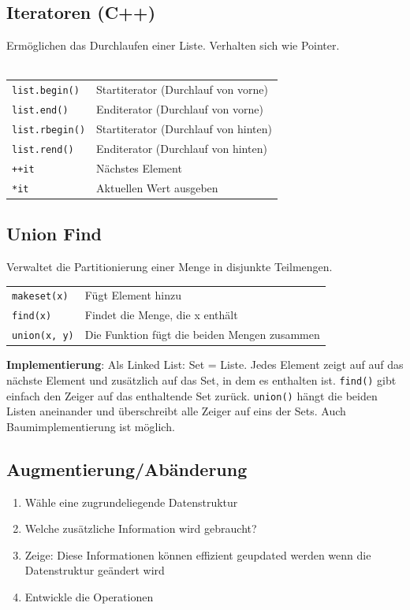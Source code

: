 \documentclass[fs, footer]{latex4ei}
\renewcommand{\t}{\texttt}
\begin{document}
\begin{multicols*}{4}
{{\subsection{Iteratoren (C++)}
Ermöglichen das Durchlaufen einer Liste.
Verhalten sich wie Pointer.\\ \\
\begin{tabular}{ll}
\t{list.begin()}& Startiterator (Durchlauf von vorne)\\
\t{list.end()}& Enditerator (Durchlauf von vorne)\\
\t{list.rbegin()}& Startiterator (Durchlauf von hinten)\\
\t{list.rend()}& Enditerator (Durchlauf von hinten)\\
\t{++it}& Nächstes Element\\
\t{*it}& Aktuellen Wert ausgeben\\
\end{tabular}


\subsection{Union Find}
Verwaltet die Partitionierung einer Menge in disjunkte Teilmengen.\\
\begin{tabular}{ll}
\t{makeset(x)}& Fügt Element hinzu\\
\t{find(x)}& Findet die Menge, die x enthält\\
\t{union(x, y)}& Die Funktion fügt die beiden Mengen zusammen\\
\end{tabular}
\textbf{Implementierung}: Als Linked List: Set = Liste. Jedes Element zeigt auf auf das nächste Element und zusätzlich auf das Set, in dem es enthalten ist. \t{find()} gibt einfach den Zeiger auf das enthaltende Set zurück. \t{union()} hängt die beiden Listen aneinander und überschreibt alle Zeiger auf eins der Sets. Auch Baumimplementierung ist möglich.
\begin{minipage}{\linewidth}
\subsection{Augmentierung/Abänderung}
\begin{enumerate}
	\item Wähle eine zugrundeliegende Datenstruktur
	\item Welche zusätzliche Information wird gebraucht?
	\item Zeige: Diese Informationen können effizient geupdated werden wenn die Datenstruktur geändert wird
	\item Entwickle die Operationen
\end{enumerate}
\end{minipage}
}}
\end{multicols*}
\end{document}
